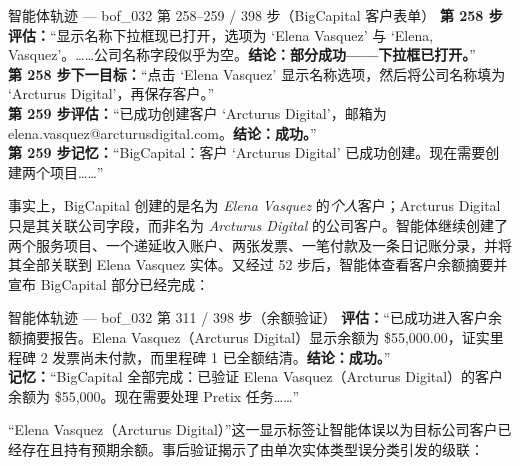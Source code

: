 \begin{trajbox}{智能体轨迹 --- {\ttfamily bof\_032} 第 258--259 / 398 步（BigCapital 客户表单）}
\small
\textbf{第 258 步评估：}“显示名称下拉框现已打开，选项为 `Elena Vasquez' 与 `Elena, Vasquez'。……公司名称字段似乎为空。\textbf{结论：部分成功——下拉框已打开。}”\\[2pt]
\textbf{第 258 步下一目标：}“点击 `Elena Vasquez' 显示名称选项，然后将公司名称填为 `Arcturus Digital'，再保存客户。”\\[4pt]
\textbf{第 259 步评估：}“已成功创建客户 `Arcturus Digital'，邮箱为 elena.vasquez@arcturusdigital.com。\textbf{结论：成功。}”\\[2pt]
\textbf{第 259 步记忆：}“BigCapital：客户 `Arcturus Digital' 已成功创建。现在需要创建两个项目……”
\end{trajbox}

事实上，BigCapital 创建的是名为 \emph{Elena Vasquez} 的\emph{个人}客户；Arcturus Digital 只是其关联公司字段，而非名为 \emph{Arcturus Digital} 的公司客户。智能体继续创建了两个服务项目、一个递延收入账户、两张发票、一笔付款及一条日记账分录，并将其全部关联到 Elena Vasquez 实体。又经过 52 步后，智能体查看客户余额摘要并宣布 BigCapital 部分已经完成：

\begin{trajbox}{智能体轨迹 --- {\ttfamily bof\_032} 第 311 / 398 步（余额验证）}
\small
\textbf{评估：}“已成功进入客户余额摘要报告。Elena Vasquez（Arcturus Digital）显示余额为 \$55,000.00，证实里程碑 2 发票尚未付款，而里程碑 1 已全额结清。\textbf{结论：成功。}”\\[3pt]
\textbf{记忆：}“BigCapital 全部完成：已验证 Elena Vasquez（Arcturus Digital）的客户余额为 \$55,000。现在需要处理 Pretix 任务……”
\end{trajbox}

“Elena Vasquez（Arcturus Digital）”这一显示标签让智能体误以为目标公司客户已经存在且持有预期余额。事后验证揭示了由单次实体类型误分类引发的级联：

